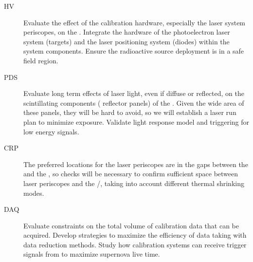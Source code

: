 \begin{description}
    \item[HV] Evaluate the effect of the calibration hardware, especially the laser system periscopes, on the \efield. 
    Integrate the hardware of the %
    photoelectron laser system (targets) and the laser positioning system (diodes) within the  system components. Ensure the radioactive source deployment is in a safe field region.
    \item[PDS] Evaluate long term effects of laser light, even if diffuse or reflected, on the scintillating components ( reflector panels) of the . Given the wide area of these panels, they will be hard to avoid, so we will establish a laser run plan to minimize exposure. Validate light response model and triggering for low energy signals. 
    \item[CRP] The preferred locations for the laser periscopes are in the gaps between the  and the , so checks will be necessary to confirm sufficient space between laser periscopes and the /, taking into account different thermal shrinking modes.
    \item[DAQ] Evaluate  constraints on the total volume of calibration data that can be acquired. Develop strategies to maximize the efficiency of data taking with data reduction methods. Study how calibration systems can receive trigger signals from  to maximize supernova live time.
\end{description}

